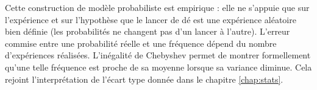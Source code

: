 Cette construction de modèle probabiliste est empirique : elle ne s'appuie que sur l'expérience et sur l'hypothèse que le lancer de dé est une expérience aléatoire bien définie (les probabilités ne changent pas d'un lancer à l'autre).
L'erreur commise entre une probabilité réelle et une fréquence dépend du nombre d'expériences réalisées.
L'inégalité de Chebyshev permet de montrer formellement qu'une telle fréquence est proche de sa moyenne lorsque sa variance diminue.
Cela rejoint l'interprétation de l'écart type donnée dans le chapitre \ref{chap:stats}.

